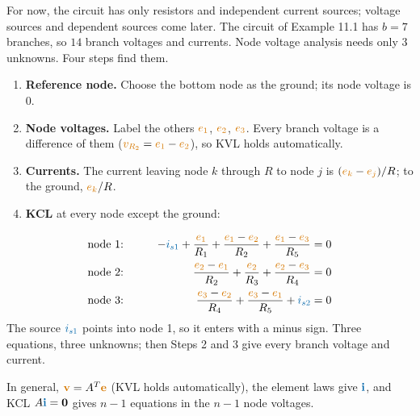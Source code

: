 \documentclass[11pt,a4paper]{article}
\newcommand{\Icol}[1]{\textcolor{ccur}{#1}}
\newcommand{\Vcol}[1]{\textcolor{cvolt}{#1}}
\newcommand{\e}[1]{\textcolor{cvolt}{e_{#1}}}
\newcommand{\nodev}[3]{\fill (#1) circle (1.7pt) node[#2, inner sep=2pt, font=\small, text=cvolt] {#3};}
\newcommand{\gnd}[1]{\draw (#1,0) -- (#1,-0.2) node[ground] {};}
\newcommand{\nodeA}[3]{\ifnum\exAst>1 \nodev{#1}{#2}{#3}\else\fill (#1) circle (1.7pt);\fi}
\newcommand{\exA}[1]{%
  \ifnum#1=0
    \draw (0,0) to[american current source, l=$\Icol{i_{s1}}$] (0,2);
  \else
    \draw (0,0) to[american current source, l=$\Icol{i_s}$] (0,2);
  \fi
  \draw (0,2) -- (1.8,2) to[R, l=$R_2$] (3.8,2) to[R, l_=$R_4$] (5.8,2);
  \draw (1.8,2) to[R, l_=$R_1$] (1.8,0);
  \draw (3.8,2) to[R, l_=$R_3$] (3.8,0);
  \draw (0,0) -- (5.8,0);
  \ifnum#1=0
    \draw (1.8,2) -- (1.8,3.0) to[R, l=$R_5$] (5.8,3.0) -- (5.8,2);
    \draw (5.8,2) to[american current source, l=$\Icol{i_{s2}}$] (5.8,0);
    \nodeA{3.8,2}{above}{$e_2$}
    \nodeA{5.8,2}{above right}{$e_3$}
    \nodeA{1.8,2}{above left}{$e_1$}
  \else
    \draw (5.8,0) to[american voltage source, invert, l_=$\Vcol{v_s}$] (5.8,2);
    \nodev{3.8,2}{above}{$e_2$}
    \ifnum#1=1 \nodev{5.8,2}{above}{$e_3$}\else \fill (5.8,2) circle (1.7pt);\fi
  \fi
  \ifnum#1=0\else\nodeA{1.8,2}{above}{$e_1$}\fi
  \ifnum\exAst>0 \gnd{3.8}\fi}
\begin{document}
For now, the circuit has only resistors and independent current sources; voltage sources and
dependent sources come later. The circuit of Example 11.1 has $b = 7$ branches, so $14$ branch
voltages and currents. Node voltage analysis needs only $3$ unknowns. Four steps find them.

\begin{examplebox}
\begin{minipage}[c]{0.42\linewidth}
\centering
{}
\end{minipage}\hfill
\begin{minipage}[c]{0.56\linewidth}
\begin{enumerate}
  \item \textbf{Reference node.} Choose the bottom node as the ground; its node voltage is $0$.
  \item \textbf{Node voltages.} Label the others $\e{1}$, $\e{2}$, $\e{3}$. Every branch
        voltage is a difference of them ($\Vcol{v_{R_2}} = \e{1} - \e{2}$), so KVL holds automatically.
  \item \textbf{Currents.} The current leaving node $k$ through $R$ to node $j$ is
        $(\e{k} - \e{j})/R$; to the ground, $\e{k}/R$.
  \item \textbf{KCL} at every node except the ground:
\end{enumerate}
\end{minipage}
\begin{alignat*}{2}
  &\text{node 1:}\qquad & -\Icol{i_{s1}} + \frac{\e{1}}{R_1} + \frac{\e{1} - \e{2}}{R_2}
                    + \frac{\e{1} - \e{3}}{R_5} &= 0\\
  &\text{node 2:}\qquad & \frac{\e{2} - \e{1}}{R_2} + \frac{\e{2}}{R_3} + \frac{\e{2} - \e{3}}{R_4} &= 0\\
  &\text{node 3:}\qquad & \frac{\e{3} - \e{2}}{R_4} + \frac{\e{3} - \e{1}}{R_5} + \Icol{i_{s2}} &= 0
\end{alignat*}
The source $\Icol{i_{s1}}$ points into node 1, so it enters with a minus sign. Three equations,
three unknowns; then Steps 2 and 3 give every branch voltage and current.
\end{examplebox}

In general, $\Vcol{\mathbf{v}} = A^T\Vcol{\mathbf{e}}$ (KVL holds automatically), the element
laws give $\Icol{\mathbf{i}}$, and KCL $A\Icol{\mathbf{i}} = \mathbf{0}$ gives $n - 1$ equations
in the $n - 1$ node voltages.
\end{document}
